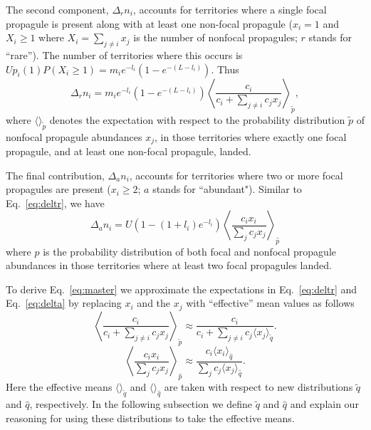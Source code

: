 \documentclass[12pt]{article}
\begin{document}
The second component, $\Delta_r n_i$, accounts for territories where a single focal propagule is present along with at least one non-focal propagule ($x_i=1$ and $X_i\geq 1$ where $X_i=\sum_{j\neq i} x_j$ is the number of nonfocal propagules; $r$ stands for ``rare''). The number of territories where this occurs is $Up_i(1)P(X_i\geq 1)=m_i e^{-l_i}(1-e^{-(L-l_i)})$. Thus 
\begin{equation}
\Delta_r n_i = m_i e^{-l_i}(1-e^{-(L-l_i)})\left\langle  \frac{c_i}{c_i +\sum_{j\neq i} c_j x_j } \right\rangle_{\tilde{p}},  \label{eq:deltr}
\end{equation}
where $\langle \rangle_{\tilde{p}}$ denotes the expectation with respect to the probability distribution $\tilde{p}$ of nonfocal propagule abundances $x_j$, in those territories where exactly one focal propagule, and at least one non-focal propagule, landed. 

The final contribution, $\Delta_a n_i$, accounts for territories where two or more focal propagules are present ($x_i\geq 2$; $a$ stands for ``abundant"). Similar to Eq.~\eqref{eq:deltr}, we have 
\begin{equation}
\Delta_a n_i=U(1-(1+l_i)e^{-l_i})\left\langle \frac{c_i x_i}{\sum_j c_j x_j} \right\rangle_{\hat{p}}\label{eq:delta}
\end{equation}
where $\hat{p}$ is the probability distribution of both focal and nonfocal propagule abundances in those territories where at least two focal propagules landed. 

To derive Eq.~\eqref{eq:master} we approximate the expectations in Eq.~\eqref{eq:deltr} and Eq.~\eqref{eq:delta} by replacing $x_i$ and the $x_j$ with ``effective'' mean values as follows 
\begin{equation}
\left\langle\frac{c_i}{c_i +\sum_{j\neq i} c_j x_j}\right\rangle_{\tilde{p}}\approx \frac{c_i}{c_i +\sum_{j\neq i} c_j \langle x_j\rangle_{\tilde{q}}}.\label{eq:meanfieldr}
\end{equation}
\begin{equation}
\left\langle \frac{c_i x_i}{\sum_j c_j x_j} \right\rangle_{\hat{p}}\approx  \frac{c_i \langle x_i \rangle_{\hat{q}}}{\sum_j c_j \langle x_j\rangle_{\hat{q}}}.\label{eq:meanfielda}
\end{equation}
Here the effective means $\langle \rangle_{\tilde{q}}$ and $\langle \rangle_{\hat{q}}$ are taken with respect to new distributions $\tilde{q}$ and $\hat{q}$, respectively. In the following subsection we define $\tilde{q}$ and $\hat{q}$ and explain our reasoning for using these distributions to take the effective means. 
\end{document}

